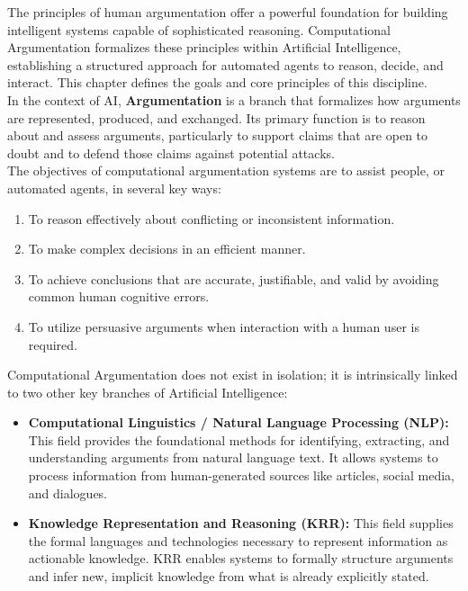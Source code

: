 \documentclass{scrbook}
\begin{document}
The principles of human argumentation offer a powerful foundation for building intelligent systems capable of sophisticated reasoning. Computational Argumentation formalizes these principles within Artificial Intelligence, establishing a structured approach for automated agents to reason, decide, and interact. This chapter defines the goals and core principles of this discipline. \\

In the context of AI, \textbf{Argumentation} is a branch that formalizes how arguments are represented, produced, and exchanged. Its primary function is to reason about and assess arguments, particularly to support claims that are open to doubt and to defend those claims against potential attacks. \\

The objectives of computational argumentation systems are to assist people, or automated agents, in several key ways:

\begin{enumerate}
    \item 
    To reason effectively about conflicting or inconsistent information.

    \item 
    To make complex decisions in an efficient manner.

    \item 
    To achieve conclusions that are accurate, justifiable, and valid by avoiding common human cognitive errors.

    \item 
    To utilize persuasive arguments when interaction with a human user is required.
\end{enumerate}

Computational Argumentation does not exist in isolation; it is intrinsically linked to two other key branches of Artificial Intelligence:

\begin{itemize}
    \item 
    \textbf{Computational Linguistics / Natural Language Processing (NLP):} This field provides the foundational methods for identifying, extracting, and understanding arguments from natural language text. It allows systems to process information from human-generated sources like articles, social media, and dialogues.

    \item 
    \textbf{Knowledge Representation and Reasoning (KRR):} This field supplies the formal languages and technologies necessary to represent information as actionable knowledge. KRR enables systems to formally structure arguments and infer new, implicit knowledge from what is already explicitly stated.
\end{itemize}
\end{document}
